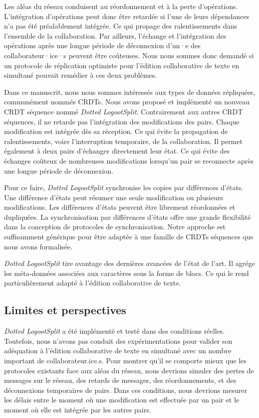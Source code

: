 Les aléas du réseau conduisent au réordonnement et à la perte d'opérations.
L'intégration d'opérations peut donc être retardée si l'une de leurs dépendances n'a pas été préalablement intégrée.
Ce qui propage des ralentissements dans l'ensemble de la collaboration.
Par ailleurs, l'échange et l'intégration des opérations après une longue période de déconnexion d'un·e des collaborateur·ice·s peuvent être coûteuses.
Nous nous sommes donc demandé si un protocole de réplication optimiste pour l'édition collaborative de texte en simultané pouvait remédier à ces deux problèmes.

Dans ce manuscrit, nous nous sommes intéressés aux types de données répliquées, communément nommés \acp{CRDT}.
Nous avons proposé et implémenté un nouveau \acs{CRDT} séquence nommé \emph{Dotted LogootSplit}.
Contrairement aux autres \acs{CRDT} séquences, il ne retarde pas l'intégration des modifications des pairs.
Chaque modification est intégrée dès sa réception.
Ce qui évite la propagation de ralentissements, voire l'interruption temporaire, de la collaboration.
Il permet également à deux pairs d'échanger directement leur état.
Ce qui évite des échanges coûteux de nombreuses modifications lorsqu'un pair se reconnecte après une longue période de déconnexion.

Pour ce faire, \emph{Dotted LogootSplit} synchronise les copies par différences d'états.
Une différence d'états peut résumer une seule modification ou plusieurs modifications.
Les différences d'états peuvent être librement réordonnées et dupliquées.
La synchronisation par différences d'états offre une grande flexibilité dans la conception de protocoles de synchronisation.
Notre approche est suffisamment générique pour être adaptée à une famille de \acp{CRDT} séquences que nous avons formalisée.

\emph{Dotted LogootSplit} tire avantage des dernières avancées de l'état de l'art.
Il agrége les méta-données associées aux caractères sous la forme de blocs.
Ce qui le rend particulièrement adapté à l'édition collaborative de texte.

\subsection{Limites et perspectives}

\emph{Dotted LogootSplit} a été implémenté et testé dans des conditions réelles.
Toutefois, nous n'avons pas conduit des expérimentations pour valider son adéquation à l'édition collaborative de texte en simultané avec un nombre important de collaborateur.ice.s.
Pour montrer qu'il se comporte mieux que les protocoles existants face aux aléas du réseau, nous devrions simuler des pertes de messages sur le réseau, des retards de messages, des réordonnements, et des déconnexions temporaires de pairs.
Dans ces conditions, nous devrions mesurer les délais entre le moment où une modification est effectuée par un pair et le moment où elle est intégrée par les autres pairs.

